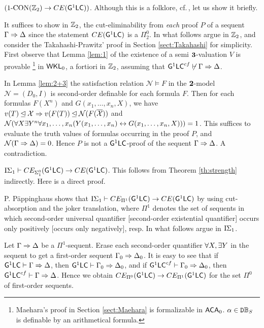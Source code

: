 \documentclass{article}
\newcommand{\bfthree}{\mbox{\boldmath$3$}}
\begin{document}
\noindent
$(1\mbox{{\rm -CON}}(\mathbb{Z}_{2})\to CE({\sf G}^{1}{\sf LC}))$.
Although this is a folklore, cf.\,\cite{GirardB}, let us show it briefly.

It suffices to show in $\mathbb{Z}_{2}$, the cut-eliminability from \textit{each} proof $P$ of a sequent $\Gamma\Rightarrow\Delta$ 
since the statement $CE({\sf G}^{1}{\sf LC})$ is a $\Pi^{0}_{2}$.
In what follows argue in $\mathbb{Z}_{2}$, and consider the Takahashi-Prawitz' proof in Section \ref{sect:Takahashi} for simplicity.
First observe that Lemma \ref{lem:1} of the existence of a semi $\bfthree$-valuation $V$ is provable
\footnote{Maehara's proof in Section \ref{sect:Maehara} is formalizable in ${\sf ACA}_{0}$. $\alpha\in{\tt D}\mathbb{B}_{S}$ is definable by an arithmetical formula.}
in ${\sf WKL}_{0}$, a fortiori in $\mathbb{Z}_{2}$,
assuming that ${\sf G}^{1}{\sf LC}^{cf}\not\vdash\Gamma\Rightarrow\Delta$.


In Lemma \ref{lem:2+3} the satisfaction relation $\mathcal{N}\models F$ in the $\mbox{\boldmath$2$}$-model $\mathcal{N}=(D_{0},I)$ is
second-order definable for each formula $F$.
Then for each formulas $F(X^{n})$ and $G(x_{1},\ldots,x_{n},X)$, we have
$v(T)\unlhd\mathcal{X} \Rightarrow v(F(T))\unlhd\mathcal{N}(F(\overline{\mathcal{X}}))$
and
\\
$\mathcal{N}(\forall X\exists Y^{n}\forall x_{1},\ldots,x_{n}(Y(x_{1},\ldots,x_{n})\leftrightarrow G(x_{1},\ldots,x_{n},X)))=1$.
This suffices to evaluate the truth values of formulas occurring in the proof $P$,
and $\mathcal{N}(\Gamma\Rightarrow\Delta)=0$.
Hence $P$ is not a ${\sf G}^{1}{\sf LC}$-proof of the sequent $\Gamma\Rightarrow\Delta$.
A contradiction.
\eprf

\bprp\label{prp:CEsigma}
$\mbox{{\rm I}}\Sigma_{1}\vdash CE_{\Sigma^{0}_{1}}({\sf G}^{1}{\sf LC}) \to CE({\sf G}^{1}{\sf LC})$.
\eprp
\bprf
This follows from Theorem \ref{th:strength} indirectly.
Here is a direct proof.

P. P\"appinghaus\cite{Paeppinghaus} shows that
$\mbox{{\rm I}}\Sigma_{1}\vdash CE_{\Pi^{1}}({\sf G}^{1}{\sf LC}) \to CE({\sf G}^{1}{\sf LC})$
by using cut-absorption and the joker translation,
where $\Pi^{1}$ denotes the set of sequents in which second-order universal quantifier [second-order existential quantifier]
occurs only positively [occurs only negatively], resp.
In what follows argue in $\mbox{{\rm I}}\Sigma_{1}$.

Let $\Gamma\Rightarrow\Delta$ be a $\Pi^{1}$-sequent.
Erase each second-order quantifier $\forall X,\exists Y$ in the sequent to get a first-order sequent $\Gamma_{0}\Rightarrow\Delta_{0}$.
It is easy to see that
if ${\sf G}^{1}{\sf LC}\vdash\Gamma\Rightarrow\Delta$, then ${\sf G}^{1}{\sf LC}\vdash\Gamma_{0}\Rightarrow\Delta_{0}$, and
if ${\sf G}^{1}{\sf LC}^{cf}\vdash\Gamma_{0}\Rightarrow\Delta_{0}$, then ${\sf G}^{1}{\sf LC}^{cf}\vdash\Gamma\Rightarrow\Delta$.
Hence we obtain $CE_{\Pi^{0}}({\sf G}^{1}{\sf LC}) \to CE_{\Pi^{1}}({\sf G}^{1}{\sf LC})$
for the set $\Pi^{0}$ of first-order sequents.
\end{document}
